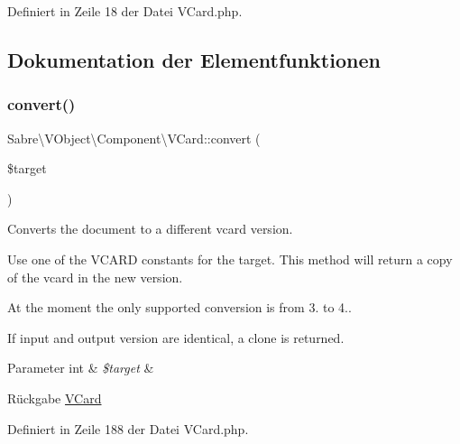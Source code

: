 Definiert in Zeile 18 der Datei V\+Card.\+php.



\subsection{Dokumentation der Elementfunktionen}
\mbox{\label{class_sabre_1_1_v_object_1_1_component_1_1_v_card_a8cf18d9fefb2775c6203ae8263f18121}} 
\subsubsection{\texorpdfstring{convert()}{convert()}}
{\footnotesize\ttfamily Sabre\textbackslash{}\+V\+Object\textbackslash{}\+Component\textbackslash{}\+V\+Card\+::convert (\begin{DoxyParamCaption}\item[{}]{\$target }\end{DoxyParamCaption})}

Converts the document to a different vcard version.

Use one of the V\+C\+A\+RD constants for the target. This method will return a copy of the vcard in the new version.

At the moment the only supported conversion is from 3. to 4..

If input and output version are identical, a clone is returned.


\begin{DoxyParams}[1]{Parameter}
int & {\em \$target} & \\
\hline
\end{DoxyParams}
\begin{DoxyReturn}{Rückgabe}
\mbox{\hyperlink{class_sabre_1_1_v_object_1_1_component_1_1_v_card}{V\+Card}} 
\end{DoxyReturn}


Definiert in Zeile 188 der Datei V\+Card.\+php.

\mbox{\label{class_sabre_1_1_v_object_1_1_component_1_1_v_card_ab4c60984867e49780da3e882876d1e68}} 
